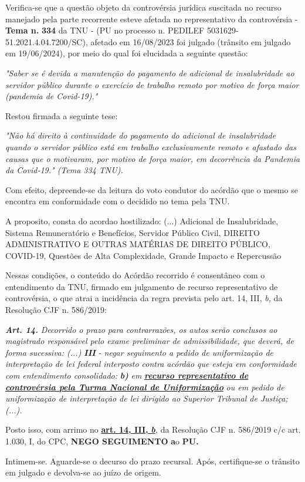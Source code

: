 \documentclass[12pt]{article}
\begin{document}
\justifying
\noindent Verifica-se que a questão objeto da controvérsia jurídica suscitada no recurso manejado pela parte recorrente esteve afetada no representativo da controvérsia - \textbf{Tema n. }\textbf{334} da TNU - (PU no processo n. PEDILEF 5031629-51.2021.4.04.7200/SC),  afetado em 16/08/2023 foi julgado (trânsito em julgado em 19/06/2024), por meio do qual foi elucidada a seguinte questão:

\noindent \textit{"Saber se é devida a manutenção do pagamento de adicional de insalubridade ao servidor público durante o exercício de trabalho remoto por motivo de força maior (pandemia de Covid-19)."}

\noindent Restou firmada a seguinte tese:

\noindent \textit{"Não há direito à continuidade do pagamento do adicional de insalubridade quando o servidor público está em trabalho exclusivamente remoto e afastado das causas que o motivaram, por motivo de força maior, em decorrência da Pandemia da Covid-19." (Tema 334 TNU).}

\noindent Com efeito, depreende-se da leitura do voto condutor do acórdão que o mesmo se encontra em conformidade com o decidido no  tema pela TNU.

\noindent A proposito, consta do acordao hostilizado: (...) Adicional de Insalubridade, Sistema Remuneratório e Benefícios, Servidor Público Civil, DIREITO ADMINISTRATIVO E OUTRAS MATÉRIAS DE DIREITO PÚBLICO, COVID-19, Questões de Alta Complexidade, Grande Impacto e Repercussão

\noindent Nessas condições, o conteúdo do Acórdão recorrido é consentâneo com o entendimento da TNU, firmado em julgamento de recurso representativo de controvérsia, o que atrai a incidência da regra prevista pelo art. 14, III, \textit{b,} da Resolução CJF n. 586/2019:

\noindent \textit{\textbf{Art. 14.}}\textit{ Decorrido o prazo para contrarrazões, os autos serão conclusos ao magistrado responsável pelo exame preliminar de admissibilidade, que deverá, de forma sucessiva: (...) }\textit{\textbf{III }}\textit{- negar seguimento a pedido de uniformização de interpretação de lei federal interposto contra acórdão que esteja em conformidade com entendimento consolidado: }\textit{\textbf{b)}}\textit{ em }\uline{\textit{\textbf{recurso representativo de controvérsia pela Turma Nacional de Uniformização}}}\textit{ ou em pedido de uniformização de interpretação de lei dirigido ao Superior Tribunal de Justiça;(...).}

\noindent Posto isso, com arrimo no \uline{\textbf{art. 14, III, }}\uline{\textit{\textbf{b}}}\textit{,} da Resolução CJF n. 586/2019 c/c art. 1.030, I, do CPC, \textbf{NEGO SEGUIMENTO }\textbf{a}o\textbf{ PU}\textbf{.}

\noindent Intimem-se. Aguarde-se o decurso do prazo recursal. Após, certifique-se o trânsito em julgado e devolva-se ao juízo de origem.
\end{document}
